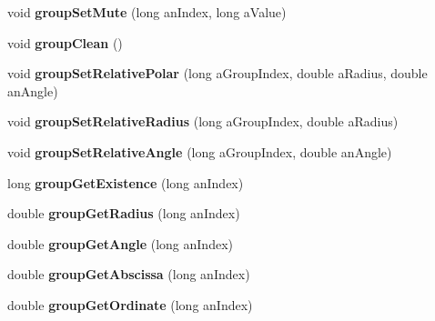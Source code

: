 \begin{DoxyCompactItemize}
\item 
\hypertarget{class_sources_manager_a6f529564bbe39636aa05f885e845cd99}{void {\bfseries group\-Set\-Mute} (long an\-Index, long a\-Value)}\label{class_sources_manager_a6f529564bbe39636aa05f885e845cd99}

\item 
\hypertarget{class_sources_manager_aafe1737e3544e863c180d0d93d5c5349}{void {\bfseries group\-Clean} ()}\label{class_sources_manager_aafe1737e3544e863c180d0d93d5c5349}

\item 
\hypertarget{class_sources_manager_a6788e669bf890b25fbddde2883dc2919}{void {\bfseries group\-Set\-Relative\-Polar} (long a\-Group\-Index, double a\-Radius, double an\-Angle)}\label{class_sources_manager_a6788e669bf890b25fbddde2883dc2919}

\item 
\hypertarget{class_sources_manager_a10f9aa77b8686a3015d70690b7db2d16}{void {\bfseries group\-Set\-Relative\-Radius} (long a\-Group\-Index, double a\-Radius)}\label{class_sources_manager_a10f9aa77b8686a3015d70690b7db2d16}

\item 
\hypertarget{class_sources_manager_a4d0bb1ce34a6ff8868960602a1c9d02f}{void {\bfseries group\-Set\-Relative\-Angle} (long a\-Group\-Index, double an\-Angle)}\label{class_sources_manager_a4d0bb1ce34a6ff8868960602a1c9d02f}

\item 
\hypertarget{class_sources_manager_a95688fd197aa0001c57de43a5a6f848f}{long {\bfseries group\-Get\-Existence} (long an\-Index)}\label{class_sources_manager_a95688fd197aa0001c57de43a5a6f848f}

\item 
\hypertarget{class_sources_manager_a903642643526ac3df35849e9b6174d48}{double {\bfseries group\-Get\-Radius} (long an\-Index)}\label{class_sources_manager_a903642643526ac3df35849e9b6174d48}

\item 
\hypertarget{class_sources_manager_a5dadc66b24e74762c1a20ccb5bd46c3c}{double {\bfseries group\-Get\-Angle} (long an\-Index)}\label{class_sources_manager_a5dadc66b24e74762c1a20ccb5bd46c3c}

\item 
\hypertarget{class_sources_manager_a3d8c470990e9668c87eade848d7dd8e8}{double {\bfseries group\-Get\-Abscissa} (long an\-Index)}\label{class_sources_manager_a3d8c470990e9668c87eade848d7dd8e8}

\item 
\hypertarget{class_sources_manager_a746d3b6e390d5ec0078edd79cab0f006}{double {\bfseries group\-Get\-Ordinate} (long an\-Index)}\label{class_sources_manager_a746d3b6e390d5ec0078edd79cab0f006}


\end{DoxyCompactItemize}
